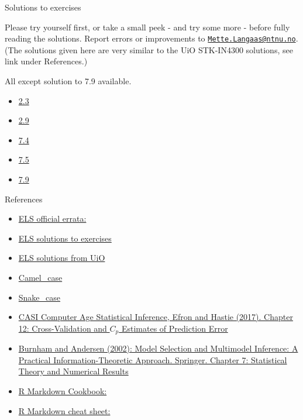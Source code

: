 \documentclass[
  ignorenonframetext,
]{beamer}
\providecommand{\tightlist}{%
  \setlength{\itemsep}{0pt}\setlength{\parskip}{0pt}}
\begin{document}
\begin{frame}{Solutions to exercises}
\protect\hypertarget{solutions-to-exercises}{}

Please try yourself first, or take a small peek - and try some more -
before fully reading the solutions. Report errors or improvements to
\href{mailto:Mette.Langaas@ntnu.no}{\nolinkurl{Mette.Langaas@ntnu.no}}.
(The solutions given here are very similar to the UiO STK-IN4300
solutions, see link under References.)

All except solution to 7.9 available.

\begin{itemize}
\tightlist
\item
  \href{https://github.com/mettelang/MA8701V2021/blob/main/ELSe23.pdf}{2.3}
\item
  \href{https://github.com/mettelang/MA8701V2021/blob/main/ELSe29.pdf}{2.9}
\item
  \href{https://github.com/mettelang/MA8701V2021/blob/main/ELSe74.pdf}{7.4}
\item
  \href{https://github.com/mettelang/MA8701V2021/blob/main/ELSe75.pdf}{7.5}
\item
  \href{https://github.com/mettelang/MA8701V2021/blob/main/ELSe79.html}{7.9}
\end{itemize}

\end{frame}

\begin{frame}{References}
\protect\hypertarget{references}{}

\begin{itemize}
\item
  \href{https://web.stanford.edu/~hastie/ElemStatLearn/errata2.html}{ELS
  official errata:}
\item
  \href{https://waxworksmath.com/Authors/G_M/Hastie/hastie.html}{ELS
  solutions to exercises}
\item
  \href{https://www.uio.no/studier/emner/matnat/math/STK-IN4300/h20/exercises.html}{ELS
  solutions from UiO}
\item
  \href{https://en.wikipedia.org/wiki/Camel_case}{Camel\_case}
\item
  \href{https://en.wikipedia.org/wiki/Snake_case}{Snake\_case}
\item
  \href{https://web.stanford.edu/~hastie/CASI_files/PDF/casi.pdf}{CASI
  Computer Age Statistical Inference, Efron and Hastie (2017). Chapter
  12: Cross-Validation and \(C_p\) Estimates of Prediction Error}
\item
  \href{https://link.springer.com/chapter/10.1007/978-0-387-22456-5_7}{Burnham
  and Andersen (2002): Model Selection and Multimodel Inference: A
  Practical Information-Theoretic Approach. Springer. Chapter 7:
  Statistical Theory and Numerical Results}
\item
  \href{https://bookdown.org/yihui/rmarkdown-cookbook/}{R Markdown
  Cookbook:}
\item
  \href{https://rstudio.com/wp-content/uploads/2015/03/rmarkdown-reference.pdf}{R
  Markdown cheat sheet:}
\end{itemize}

\end{frame}
\end{document}
